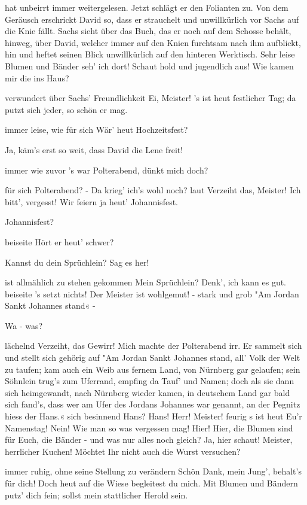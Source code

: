 \begin{drama}
\Sachsspeaks
hat unbeirrt immer weitergelesen. Jetzt schlägt er den Folianten zu. Von dem Geräusch erschrickt David so, dass er strauchelt und unwillkürlich vor Sachs auf die Knie fällt. Sachs sieht über das Buch, das er noch auf dem Schosse behält, hinweg, über David, welcher immer auf den Knien furchtsam nach ihm aufblickt, hin und heftet seinen Blick unwillkürlich auf den hinteren Werktisch. Sehr leise
Blumen und Bänder seh' ich dort!
Schaut hold und jugendlich aus!
Wie kamen mir die ins Haus?

\Davidspeaks
verwundert über Sachs' Freundlichkeit
Ei, Meister! 's ist heut festlicher Tag;
da putzt sich jeder, so schön er mag.

\Sachsspeaks
immer leise, wie für sich
Wär' heut Hochzeitsfest?

\Davidspeaks
Ja, käm's erst so weit, dass David die Lene freit!

\Sachsspeaks
immer wie zuvor
's war Polterabend, dünkt mich doch?

\Davidspeaks
für sich
Polterabend? - Da krieg' ich's wohl noch?
laut
Verzeiht das, Meister! Ich bitt', vergesst! Wir feiern ja heut' Johannisfest.

\Sachsspeaks
Johannisfest?

\Davidspeaks
beiseite
Hört er heut' schwer?

\Sachsspeaks
Kannst du dein Sprüchlein? Sag es her!

\Davidspeaks
ist allmählich zu stehen gekommen
Mein Sprüchlein? Denk', ich kann es gut.
beiseite
's setzt nichts! Der Meister ist wohlgemut! -
stark und grob
"Am Jordan Sankt Johannes stand« -

\Sachsspeaks
Wa - was?

\Davidspeaks
lächelnd
Verzeiht, das Gewirr! Mich machte der Polterabend irr.
Er sammelt sich und stellt sich gehörig auf
"Am Jordan Sankt Johannes stand,
all' Volk der Welt zu taufen;
kam auch ein Weib aus fernem Land,
von Nürnberg gar gelaufen;
sein Söhnlein trug's zum Uferrand,
empfing da Tauf' und Namen;
doch als sie dann sich heimgewandt,
nach Nürnberg wieder kamen,
in deutschem Land gar bald sich fand's,
dass wer am Ufer des Jordans
Johannes war genannt,
an der Pegnitz hiess der Hans.«
sich besinnend
Hans? Hans!
Herr! Meister!
feurig
s ist heut Eu'r Namenstag!
Nein! Wie man so was vergessen mag!
Hier! Hier, die Blumen sind für Euch,
die Bänder - und was nur alles noch gleich?
Ja, hier schaut! Meister, herrlicher Kuchen!
Möchtet Ihr nicht auch die Wurst versuchen?

\Sachsspeaks
immer ruhig, ohne seine Stellung zu verändern
Schön Dank, mein Jung', behalt's für dich!
Doch heut auf die Wiese begleitest du mich.
Mit Blumen und Bändern putz' dich fein;
sollst mein stattlicher Herold sein.


\end{drama}
